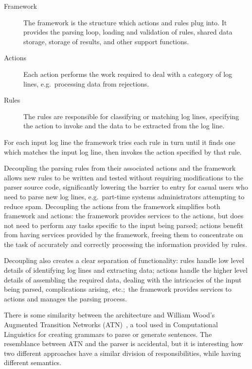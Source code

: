 \documentclass[draft]{svmult}
\begin{document}
\begin{description}

    \item [Framework]  The framework is the structure which actions and
        rules plug into.  It provides the parsing loop, loading and
        validation of rules, shared data storage, storage of results, and
        other support functions.

    \item [Actions]  Each action performs the work required to deal with a
        category of log lines, e.g.\ processing data from rejections.

    \item [Rules]  The rules are responsible for classifying or matching
        log lines, specifying the action to invoke and the data to be
        extracted from the log line.

\end{description}

For each input log line the framework tries each rule in turn until it
finds one which matches the input log line, then invokes the action
specified by that rule.

Decoupling the parsing rules from their associated actions and the
framework allows new rules to be written and tested without requiring
modifications to the parser source code, significantly lowering the barrier
to entry for casual users who need to parse new log lines, e.g.\ part-time
systems administrators attempting to reduce spam.  Decoupling the actions
from the framework simplifies both framework and actions: the framework
provides services to the actions, but does not need to perform any tasks
specific to the input being parsed; actions benefit from having services
provided by the framework, freeing them to concentrate on the task of
accurately and correctly processing the information provided by rules.

Decoupling also creates a clear separation of functionality: rules handle
low level details of identifying log lines and extracting data; actions
handle the higher level details of assembling the required data, dealing
with the intricacies of the input being parsed, complications arising,
etc.;\ the framework provides services to actions and manages the parsing
process.

There is some similarity between the architecture and William Wood's
Augmented Transition Networks (ATN)~\cite{atns, nlpip}, a tool used in
Computational Linguistics for creating grammars to parse or generate
sentences.  The resemblance between ATN and the parser is accidental, but
it is interesting how two different approaches have a similar division of
responsibilities, while having different semantics.
\end{document}
